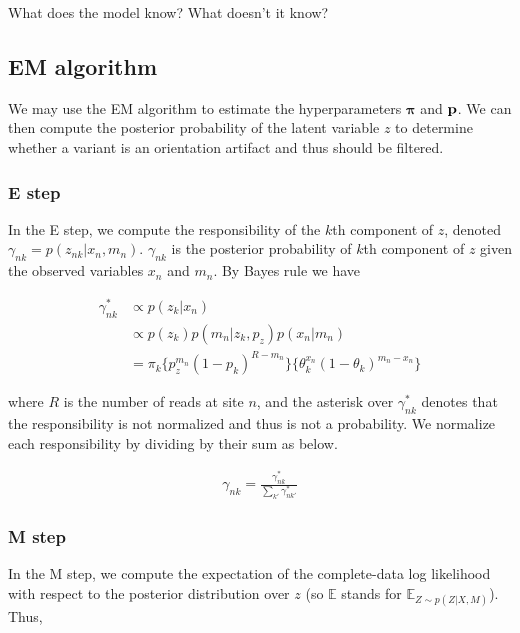 \documentclass[a4paper]{article}
\newcommand{\vp}{{\bf p}}
\newcommand{\vpi}{{\bm \pi}}
\newcommand{\E}{\mathbb{E}}
\begin{document}
What does the model know? What doesn't it know? 

\subsection{EM algorithm}
We may use the EM algorithm to estimate the hyperparameters $\vpi$ and $\vp$. We can then compute the posterior probability of the latent variable $z$ to determine whether a variant is an orientation artifact and thus should be filtered.

\subsubsection{E step}
In the E step, we compute the responsibility of the $k$th component of $z$, denoted $\gamma_{nk} = p(z_{nk} | x_n, m_n)$. $\gamma_{nk}$ is the posterior probability of $k$th component of $z$ given the observed variables $x_n$ and $m_n$. By Bayes rule we have

\begin{align}
\gamma^*_{nk} &\propto p(z_{k} | x_n) \nonumber \\
		        &\propto p(z_{k}) p(m_n | z_k, p_{z} ) p(x_n | m_n ) \nonumber \\
		        &= \pi_k  \{ p_{z}^{m_n} (1-p_k)^{R - m_n} \} \{ \theta_k^{x_n} (1 - \theta_k)^{m_n - x_n} \}
\end{align}

where $R$ is the number of reads at site $n$, and the asterisk over $\gamma^*_{nk}$ denotes that the responsibility is not normalized and thus is not a probability. We normalize each responsibility by dividing by their sum as below.

\begin{align}
\gamma_{nk} = \frac{\gamma^*_{nk}}{\sum_{k'} \gamma^*_{nk'}}
\end{align}

\subsubsection{M step}
In the M step, we compute the expectation of the complete-data log likelihood with respect to the posterior distribution over $z$ (so $\E$ stands for $\E_{Z \sim p(Z|X,M)}$). Thus,
\end{document}
